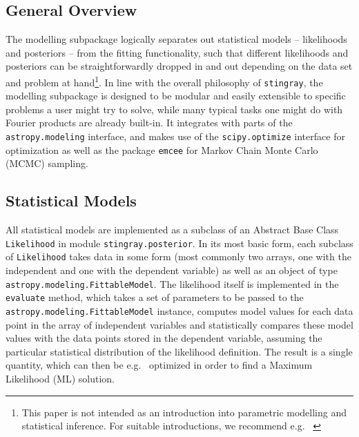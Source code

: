 \documentclass[12pt]{emulateapj}
\newcommand{\stingray}{\texttt{stingray}\xspace}
\newcommand{\likelihood}{\texttt{Likelihood}\xspace}
\begin{document}
\subsection{General Overview}
The modelling subpackage logically separates out statistical models -- likelihoods and posteriors -- from the fitting functionality, such that different likelihoods and posteriors can be straightforwardly dropped in and out depending on the data set and problem at hand\footnote{This paper is not intended as an introduction into parametric modelling and statistical inference. For suitable introductions, we recommend e.g.~ \citet{hogg2010}}. In line with the overall philosophy of \stingray, the modelling subpackage is designed to be modular and easily extensible to specific problems a user might try to solve, while many typical tasks one might do with Fourier products are already built-in. It integrates with parts of the \verb|astropy.modeling| interface, and makes use of the \verb|scipy.optimize| interface for optimization as well as the package \texttt{emcee} for Markov Chain Monte Carlo (MCMC) sampling.

\subsection{Statistical Models}

All statistical models are implemented as a subclass of an Abstract Base Class \likelihood in module \verb|stingray.posterior|. In its most basic form, each subclass of \likelihood takes data in some form (most commonly two arrays, one with the independent and one with the dependent variable) as well as an object of type \verb|astropy.modeling.FittableModel|. The likelihood itself is implemented in the \texttt{evaluate} method, which takes a set of parameters to be passed to the \verb|astropy.modeling.FittableModel| instance, computes model values for each data point in the array of independent variables and statistically compares these model values with the data points stored in the dependent variable, assuming the particular statistical distribution of the likelihood definition. The result is a single quantity, which can then be e.g.~ optimized in order to find a Maximum Likelihood (ML) solution.
\end{document}

